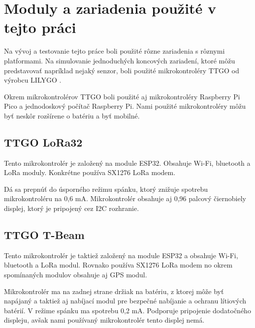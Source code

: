 \documentclass[slovak,master]{diploma}
\begin{document}
\section{Moduly a zariadenia použité v tejto práci}
Na vývoj a testovanie tejto práce boli použité rôzne zariadenia s rôznymi platformami. Na simulovanie jednoduchých koncových zariadení, 
ktoré môžu predstavovať napríklad nejaký senzor, boli použité mikrokontroléry TTGO od výrobcu LILYGO \cite{lilygo}.

Okrem mikrokontrolérov TTGO boli použité aj mikrokontroléry Raspberry Pi Pico a jednodoskový počítač Raspberry Pi.
Nami použité mikrokontroléry môžu byť neskôr rozšírene o batériu a byť mobilné.

\subsection{TTGO LoRa32}
Tento mikrokontrolér je založený na module ESP32. Obsahuje Wi-Fi, bluetooth a LoRa moduly. 
Konkrétne používa SX1276 LoRa modem.

Dá sa prepnúť do úsporného režimu spánku, ktorý znižuje spotrebu mikrokontroléru na 0,6 mA.
Mikrokontrolér obsahuje aj 0,96 palcový čiernobiely displej, ktorý je pripojený cez I2C rozhranie.

\subsection{TTGO T-Beam}
Tento mikrokontrolér je taktiež založený na module ESP32 a obsahuje Wi-Fi, bluetooth a LoRa modul.
Rovnako používa SX1276 LoRa modem no okrem spomínaných modulov obsahuje aj GPS modul.

Mikrokontrolér ma na zadnej strane držiak na batériu, z ktorej môže byť napájaný a taktiež aj nabíjací modul 
pre bezpečné nabíjanie a ochranu lítiových batérií.
V režime spánku ma spotrebu 0,2 mA. Podporuje pripojenie dodatočného displeju, avšak nami používaný mikrokontrolér tento displej nemá.
\end{document}
